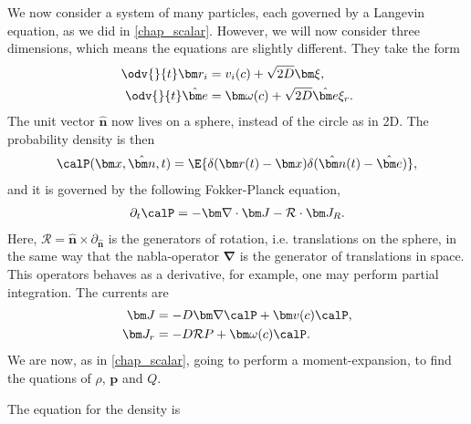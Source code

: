 We now consider a system of many particles, each governed by a Langevin equation, as we did in \autoref{chap_scalar}.
However, we will now consider three dimensions, which means the equations are slightly different.
They take the form
\begin{align}
    \odv{}{t} \bm r_i &= v_i(c) + \sqrt{2D } \bm \xi,\\
    \odv{}{t} \hat{\bm e} & = \bm \omega(c) + \sqrt{2D} \hat{\bm e} \xi_r.
\end{align}
%
The unit vector $\hat {\bm n}$ now lives on a sphere, instead of the circle as in 2D.
The probability density is then
\begin{align}
    \calP(\bm x, \hat{\bm n}, t)
    = \E{ \delta(\bm r(t) - \bm x ) \delta(\hat{\bm n}(t) - \hat{\bm e}) },
\end{align}
%
and it is governed by the following Fokker-Planck equation,
%
\begin{align}
    \partial_t \calP = - \bm \nabla \cdot \bm J - \mathcal{R} \cdot \bm J_R.
\end{align}
%
Here, $\mathcal{R} = \hat{\bm n} \times \partial_{\hat{\bm n}}$ is the generators of rotation, i.e. translations on the sphere, in the same way that the nabla-operator $\bm \nabla$ is the generator of translations in space.
This operators behaves as a derivative, for example, one may perform partial integration.
The currents are
\begin{align}
    \bm J & = - D \bm \nabla \calP + \bm v(c) \calP,\\ 
    \bm J_r &= - D \mathcal{R} P + \bm \omega(c) \calP.
\end{align}
%
We are now, as in \autoref{chap_scalar}, going to perform a moment-expansion, to find the quations of $\rho$, $\bm p$ and $Q$.

The equation for the density is

